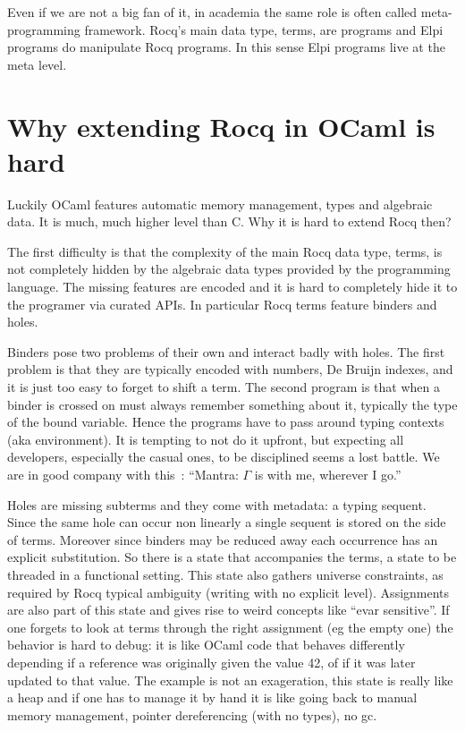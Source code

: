 \documentclass[a4paper, 11pt]{book}
\begin{document}
Even if we are not a big fan of it, in academia the same role is often called
meta-programming framework. Rocq's main data type, terms, are programs and Elpi
programs do manipulate Rocq programs. In this sense Elpi programs live at the
meta level.

\section{Why extending Rocq in OCaml is hard}

Luckily OCaml features automatic memory management, types and algebraic data.
It is much, much higher level than C. Why it is hard to extend Rocq then?

The first difficulty is that the complexity of the main Rocq data type, terms,
is not completely hidden by the algebraic data types provided by the programming
language. The missing features are encoded and it is hard to completely hide
it to the programer via curated APIs. In particular Rocq terms feature binders
and holes. 

Binders pose two problems of their own and interact badly with holes.
The first problem is that they are typically encoded with numbers, De Bruijn
indexes, and it is just too easy to forget to shift a term.  The second program
is that when a binder is crossed on must always remember something about it,
typically the type of the bound variable. Hence the programs have to pass around
typing contexts (aka environment). It is tempting to not do it upfront, but
expecting all developers, especially the casual ones, to be disciplined seems
a lost battle. We are in good company with this~\cite[page 20]{mcbride}:
``Mantra: $\Gamma$ is with me, wherever I go.''

Holes are missing subterms and they come with metadata: a typing sequent.
Since the same hole can occur non linearly a single sequent is stored on the side of terms.
Moreover since binders may be reduced away each occurrence has an explicit
substitution. So there is a state that accompanies the terms, a state to be
threaded in a functional setting. This state also gathers universe constraints,
as required by Rocq typical ambiguity (writing  with no
explicit level).
Assignments are also part of this state and gives rise to weird concepts
like ``evar sensitive''. If one forgets to look at terms
through the right assignment (eg the empty one) the behavior is
hard to debug: it is like OCaml code that behaves differently depending
if a reference  was originally given the value 42, of
if it was later updated to that value.
The example is not an exageration, this state is really like
a heap and if one has to manage it by hand it is like
going back to manual memory management, pointer dereferencing (with no
types), no gc.
\end{document}
